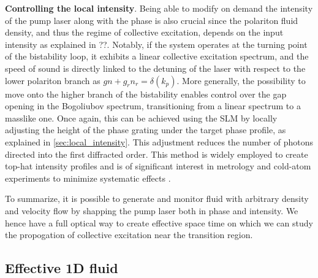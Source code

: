 \textbf{Controlling the local intensity}. Being able to modify on demand the intensity of the pump laser along with the phase is also crucial since the polariton fluid density, and thus the regime of collective excitation, depends on the input intensity as explained in ??. 
Notably, if the system operates at the turning point of the bistability loop, it exhibits a linear collective excitation spectrum, and the speed of sound is directly linked to the detuning of the laser with respect to the lower polariton branch as $gn+g_rn_r=\delta(k_p)$. 
More generally, the possibility to move onto the higher branch of the bistability enables control over the gap opening in the Bogoliubov spectrum, transitioning from a linear spectrum to a masslike one.  
Once again, this can be achieved using the SLM by locally adjusting the height of the phase grating under the target phase profile, as explained in \autoref{sec:local_intensity}. This adjustment reduces the number of photons directed into the first diffracted order. This method is widely employed to create top-hat intensity profiles and is of significant interest in metrology and cold-atom experiments to minimize systematic effects \cite{top_metrology_2018}.  

\bigskip




To summarize, it is possible to generate and monitor fluid with arbitrary density and velocity flow by shapping the pump laser both in phase and intensity. We hence have a full optical way to create
effective space time on which we can study the propogation of collective excitation near the transition region.

\subsection{Effective 1D fluid}

